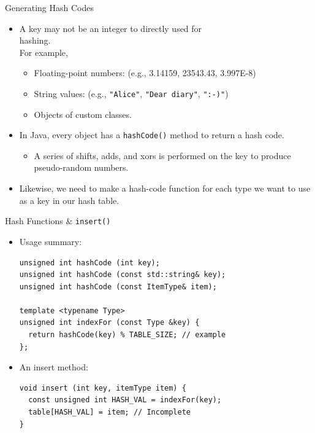 \documentclass[14pt,aspectratio=1610]{beamer}
\begin{document}
\begin{frame}{Generating Hash Codes}
\begin{itemize}
  \item<2->
    A key may not be an integer to directly used for \\hashing.\\
    For example,
    \begin{itemize}
      \item Floating-point numbers: (e.g., 3.14159, 23543.43, 3.997E-8)
      \item String values: (e.g., \texttt{"Alice"}, \texttt{"Dear diary"}, \texttt{":-)"})
      \item Objects of custom classes.
    \end{itemize}
  \item<3->
    In Java, every object has a \lstinline{hashCode()} method to return a hash code.
    \begin{itemize}
    \item
      A series of shifts, adds, and xors is performed on the key to produce pseudo-random numbers.
    \end{itemize}
  \item<4->
    Likewise, we need to make a hash-code function for each type we want to use as a key in our hash table.
\end{itemize}
\end{frame}

\begin{frame}[fragile]{Hash Functions \& \texttt{insert()}}
\begin{itemize}
\item
  Usage summary:\\
  \begin{lstlisting}[basicstyle=\ttfamily\small]
unsigned int hashCode (int key);
unsigned int hashCode (const std::string& key);
unsigned int hashCode (const ItemType& item);

template <typename Type>
unsigned int indexFor (const Type &key) {
  return hashCode(key) % TABLE_SIZE; // example
};
\end{lstlisting}
\item
  An insert method:
  \begin{lstlisting}[basicstyle=\ttfamily\small]
void insert (int key, itemType item) {
  const unsigned int HASH_VAL = indexFor(key);
  table[HASH_VAL] = item; // Incomplete
}
\end{lstlisting}
\end{itemize}
\end{frame}
\end{document}
